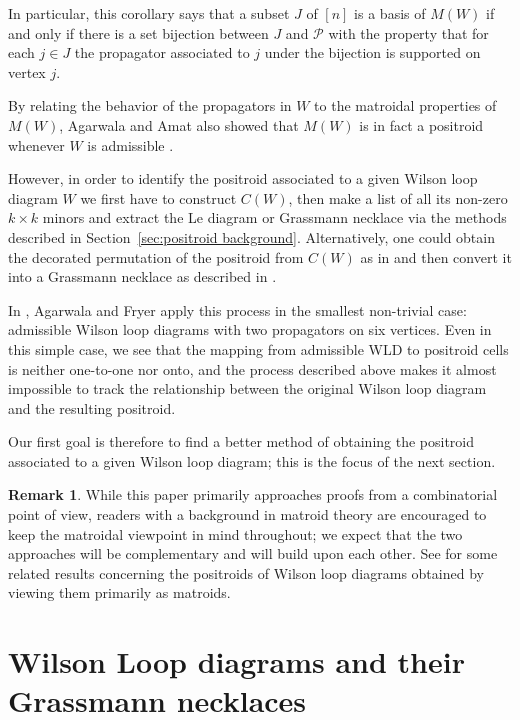 \documentclass[11pt]{article}
\newcommand{\hlfix}[2]{\texthl{#1}\todo{#2}}
\newcommand{\cP}{\mathcal{P}}
\theoremstyle{remark}
\theoremstyle{definition}
\newtheorem{rmk}[thm]{Remark}
\begin{document}
In particular, this corollary says that a subset $J$ of $[n]$ is a basis of $M(W)$ if and only if there is a set bijection between $J$ and $\cP$ with the property that for each $j\in J$ the propagator associated to $j$ under the bijection is supported on vertex $j$.


By relating the behavior of the propagators in $W$ to the matroidal properties of $M(W)$, Agarwala and Amat also showed that $M(W)$ is in fact a positroid whenever $W$ is admissible \cite[Corollary 3.39]{wilsonloop}.

However, in order to identify the positroid associated to a given Wilson loop diagram $W$ we first have to construct $C(W)$, then make a list of all its non-zero $k\times k$ minors and extract the Le diagram or Grassmann necklace via the methods described in Section~\ref{sec:positroid background}. Alternatively, one could obtain the decorated permutation of the positroid from $C(W)$ as in \hlfix{[ref]}{Sian needs to go find this reference} and then convert it into a Grassmann necklace as described in \cite[Section 16]{Postnikov}. 

In \cite{casestudy}, Agarwala and Fryer apply this process in the smallest non-trivial case: admissible Wilson loop diagrams with two propagators on six vertices. Even in this simple case, we see that the mapping from admissible WLD to positroid cells is neither one-to-one nor onto, and the process described above makes it almost impossible to track the relationship between the original Wilson loop diagram and the resulting positroid.

Our first goal is therefore to find a better method of obtaining the positroid associated to a given Wilson loop diagram; this is the focus of the next section.

\begin{rmk}
While this paper primarily approaches proofs from a combinatorial point of view, readers with a background in matroid theory are encouraged to keep the matroidal viewpoint in mind throughout; we expect that the two approaches will be complementary and will build upon each other. See \cite{generalcombinatoricsI} for some related results concerning the positroids of Wilson loop diagrams obtained by viewing them primarily as matroids.
\end{rmk}




\section{Wilson Loop diagrams and their Grassmann necklaces}\label{sec GN algorithm}
\end{document}
